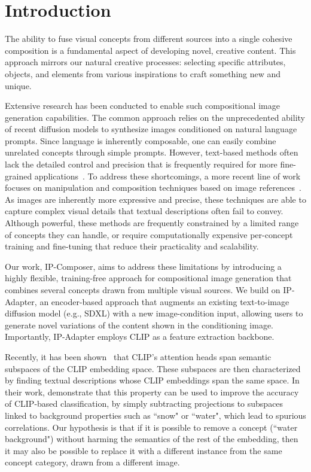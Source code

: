 \vspace{-10pt}
\section{Introduction}
The ability to fuse visual concepts from different sources into a single cohesive composition is a fundamental aspect of developing novel, creative content. This approach mirrors our natural creative processes: selecting specific attributes, objects, and elements from various inspirations to craft something new and unique. 

Extensive research has been conducted to enable such compositional image generation capabilities. The common approach relies on the unprecedented ability of recent diffusion models to synthesize images conditioned on natural language prompts. Since language is inherently composable, one can easily combine unrelated concepts through simple prompts. However, text-based methods often lack the detailed control and precision that is frequently required for more fine-grained applications~\cite{Zhang_2023_ICCV,gal2022textual,ruiz2022dreambooth}. To address these shortcomings, a more recent line of work focuses on manipulation and composition techniques based on image references~\cite{richardson2024popsphotoinspireddiffusionoperators,lee2024languageinformedvisualconceptlearning,zhang2023prospectpromptspectrumattributeaware,vinker2023concept}. As images are inherently more expressive and precise, these techniques are able to capture complex visual details that textual descriptions often fail to convey. Although powerful, these methods are frequently constrained by a limited range of concepts they can handle, or require computationally expensive per-concept training and fine-tuning that reduce their practicality and scalability. 

Our work, IP-Composer, aims to address these limitations by introducing a highly flexible, training-free approach for compositional image generation that combines several concepts drawn from multiple visual sources.
We build on IP-Adapter, an encoder-based approach that augments an existing text-to-image diffusion model (e.g., SDXL) with a new image-condition input, allowing users to generate novel variations of the content shown in the conditioning image. Importantly, IP-Adapter employs CLIP as a feature extraction backbone. 

Recently, it has been shown~\citep{gandelsman2024interpretingclipsimagerepresentation} that CLIP's attention heads span semantic subspaces of the CLIP embedding space. These subspaces are then characterized by finding textual descriptions whose CLIP embeddings span the same space. In their work, \citet{gandelsman2024interpretingclipsimagerepresentation} demonstrate that this property can be used to improve the accuracy of CLIP-based classification, by simply subtracting projections to subspaces linked to background properties such as ``snow" or ``water", which lead to spurious correlations. 
Our hypothesis is that if it is possible to remove a concept (``water background") without harming the semantics of the rest of the embedding, then it may also be possible to replace it with a different instance from the same concept category, drawn from a different image. 


